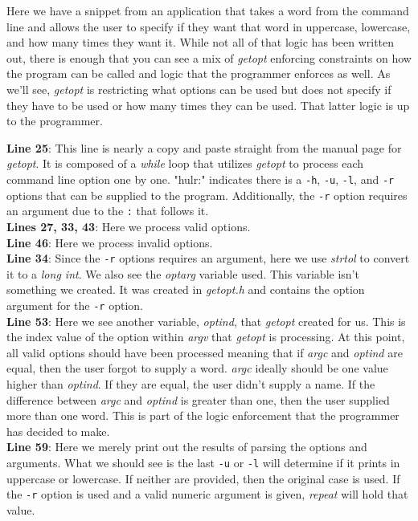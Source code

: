 \documentclass[../main.tex]{subfiles}
\begin{document}
	
	
	Here we have a snippet from an application that takes a word from the command line and allows the user to specify if they want that word in uppercase, lowercase, and how many times they want it.  While not all of that logic has been written out, there is enough that you can see a mix of \textit{getopt} enforcing constraints on how the program can be called and logic that the programmer enforces as well.  As we'll see, \textit{getopt} is restricting what options can be used but does not specify if they have to be used or how many times they can be used.  That latter logic is up to the programmer.
	  
	\textbf{Line 25}: This line is nearly a copy and paste straight from the manual page for \textit{getopt}.  It is composed of a \textit{while} loop that utilizes \textit{getopt} to process each command line option one by one. "hulr:" indicates there is a \texttt{-h}, \texttt{-u}, \texttt{-l}, and \texttt{-r} options that can be supplied to the program.  Additionally, the \texttt{-r} option requires an argument due to the \texttt{:} that follows it. \\
	\textbf{Lines 27, 33, 43}: Here we process valid options.\\
	\textbf{Line 46}: Here we process invalid options.\\
	\textbf{Line 34}: Since the \texttt{-r} options requires an argument, here we use \textit{strtol} to convert it to a \textit{long int}.  We also see the \textit{optarg} variable used.  This variable isn't something we created.  It was created in \textit{getopt.h} and contains the option argument for the \texttt{-r} option. \\
	\textbf{Line 53}: Here we see another variable, \textit{optind}, that \textit{getopt} created for us.  This is the index value of the option within \textit{argv} that \textit{getopt} is processing.  At this point, all valid options should have been processed meaning that if \textit{argc} and \textit{optind} are equal, then the user forgot to supply a word.  \textit{argc} ideally should be one value higher than \textit{optind}.  If they are equal, the user didn't supply a name.  If the difference between \textit{argc} and \textit{optind} is greater than one, then the user supplied more than one word.  This is part of the logic enforcement that the programmer has decided to make.\\
	\textbf{Line 59}: Here we merely print out the results of parsing the options and arguments.  What we should see is the last \texttt{-u} or \texttt{-l} will determine if it prints in uppercase or lowercase.  If neither are provided, then the original case is used.  If the \texttt{-r} option is used and a valid numeric argument is given, \textit{repeat} will hold that value.\\ 
\end{document}
